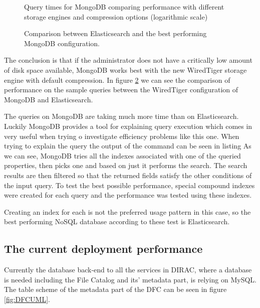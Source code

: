 \begin{figure}[h]
	\centering
	
	\caption{Query times for MongoDB comparing performance with different storage engines and compression 
	options (logarithmic scale)}
	\label{fig:MDBcomparison}
\end{figure}

\begin{figure}[h]
	\centering
	
	\caption{Comparison between Elasticsearch and the best performing MongoDB configuration.}
	\label{fig:DBscomparison}
\end{figure}

The conclusion is that if the administrator does not have a critically low amount of disk space available, MongoDB
works best with the new WiredTiger storage engine with default compression. In figure \ref{fig:DBscomparison} we 
can see the comparison of performance on the sample queries between the WiredTiger configuration of MongoDB and 
Elasticsearch. 



The queries on MongoDB are taking much more time than on Elasticsearch. Luckily MongoDB provides
a tool for explaining query execution which comes in very useful when trying o investigate efficiency problems
like this one. When trying to explain the query %
the output of the command can be seen in listing %
As we can see, MongoDB tries all the indexes associated with one of the queried properties, then picks one and 
based on just it performs the search. The search results are then filtered so that the returned fields satisfy the
other conditions of the input query. To test the best possible performance, special compound indexes were created 
for each query and the performance was tested using these indexes. 


Creating an index for each is not the preferred usage pattern in this case, so the best performing NoSQL database
according to these test is Elasticsearch.

\subsection{The current deployment performance}

Currently the database back-end to all the services in DIRAC, where a database is needed including the File Catalog
and its' metadata part, is relying on MySQL. The table scheme of the metadata part of the DFC can be seen in figure
\ref{fig:DFCUML}.

